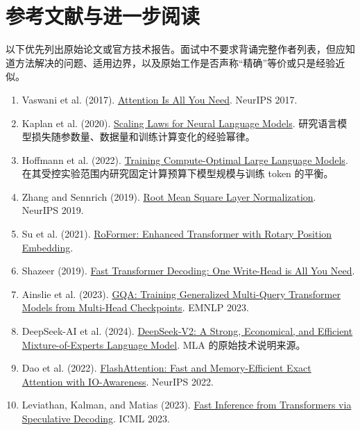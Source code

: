 \chapter*{参考文献与进一步阅读}

\begin{takeawaybox}
以下优先列出原始论文或官方技术报告。面试中不要求背诵完整作者列表，但应知道方法解决的问题、适用边界，以及原始工作是否声称“精确”等价或只是经验近似。
\end{takeawaybox}

\small
\begin{enumerate}[leftmargin=2em]
  \item Vaswani et al. (2017). \href{https://arxiv.org/abs/1706.03762}{Attention Is All You Need}. NeurIPS 2017.
  \item Kaplan et al. (2020). \href{https://arxiv.org/abs/2001.08361}{Scaling Laws for Neural Language Models}. 研究语言模型损失随参数量、数据量和训练计算变化的经验幂律。
  \item Hoffmann et al. (2022). \href{https://arxiv.org/abs/2203.15556}{Training Compute-Optimal Large Language Models}. 在其受控实验范围内研究固定计算预算下模型规模与训练 token 的平衡。
  \item Zhang and Sennrich (2019). \href{https://arxiv.org/abs/1910.07467}{Root Mean Square Layer Normalization}. NeurIPS 2019.
  \item Su et al. (2021). \href{https://arxiv.org/abs/2104.09864}{RoFormer: Enhanced Transformer with Rotary Position Embedding}.
  \item Shazeer (2019). \href{https://arxiv.org/abs/1911.02150}{Fast Transformer Decoding: One Write-Head is All You Need}.
  \item Ainslie et al. (2023). \href{https://arxiv.org/abs/2305.13245}{GQA: Training Generalized Multi-Query Transformer Models from Multi-Head Checkpoints}. EMNLP 2023.
  \item DeepSeek-AI et al. (2024). \href{https://arxiv.org/abs/2405.04434}{DeepSeek-V2: A Strong, Economical, and Efficient Mixture-of-Experts Language Model}. MLA 的原始技术说明来源。
  \item Dao et al. (2022). \href{https://arxiv.org/abs/2205.14135}{FlashAttention: Fast and Memory-Efficient Exact Attention with IO-Awareness}. NeurIPS 2022.
  \item Leviathan, Kalman, and Matias (2023). \href{https://arxiv.org/abs/2211.17192}{Fast Inference from Transformers via Speculative Decoding}. ICML 2023.

\end{enumerate}

